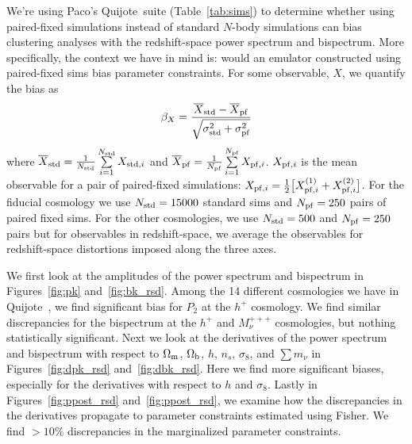 \documentclass[12pt, letterpaper, preprint]{aastex62}
\newcommand{\Om}{\Omega_{\rm m}}
\newcommand{\Ob}{\Omega_{\rm b}}
\newcommand{\smnu}{\sum m_\nu}
\newcommand{\sig}{\sigma_8}
\newcommand{\quij}{{\sc Quijote}~}
\newcommand{\beq}{\begin{equation}}
\newcommand{\eeq}{\end{equation}}
\begin{document}
\sloppy\sloppypar\frenchspacing 
We're using Paco's \quij suite (Table~\ref{tab:sims}) to determine
whether using paired-fixed simulations instead of standard $N$-body 
simulations can bias clustering analyses with the redshift-space
power spectrum and bispectrum. More specifically, the context we have
in mind is: would an emulator constructed using paired-fixed sims
bias parameter constraints. For some observable, $X$, we quantify the 
bias as
\beq
\beta_X = \frac{\overline{X}_{\rm std} - \overline{X}_{\rm pf}}{\sqrt{\sigma_{\rm std}^2 + \sigma_{\rm pf}^2}}
\eeq
where $\overline{X}_{\rm std} = \frac{1}{N_{\rm std}}\sum\limits_{i=1}^{N_{\rm std}} X_{{\rm std}, i}$ 
and $\overline{X}_{\rm pf} = \frac{1}{N_{\rm pf}}\sum\limits_{i=1}^{N_{\rm pf}} X_{{\rm pf}, i}$. 
$X_{{\rm pf},i}$ is the mean observable for a pair of paired-fixed simulations: 
$X_{{\rm pf},i} = \frac{1}{2} \big[ X_{{\rm pf},i}^{(1)} + X_{{\rm pf},i}^{(2)}\big]$.
For the fiducial cosmology we use $N_{\rm std} = 15000$ standard sims and 
$N_{\rm pf} = 250$ pairs of paired fixed sims. For the other cosmologies, 
we use $N_{\rm std} = 500$ and $N_{\rm pf} = 250$ pairs but for observables
in redshift-space, we average the observables for redshift-space distortions
imposed along the three axes. 

We first look at the amplitudes of the power spectrum and bispectrum in 
Figures~\ref{fig:pk} and~\ref{fig:bk_rsd}. Among the 14 different 
cosmologies we have in \quij, we find significant bias for $P_2$ at
the $h^+$ cosmology. We find similar discrepancies for the bispectrum  
at the $h^+$ and $M_\nu^{+++}$ cosmologies, but nothing statistically 
significant. Next we look at the derivatives of the power 
spectrum and bispectrum with respect to $\Om$, $\Ob$, $h$, $n_s$, $\sig$, 
and $\smnu$ in Figures~\ref{fig:dpk_rsd} and~\ref{fig:dbk_rsd}. Here we 
find more significant biases, especially for the derivatives with respect 
to $h$ and $\sig$. Lastly in Figures~\ref{fig:ppost_rsd} and~\ref{fig:ppost_rsd}, 
we examine how the discrepancies in the derivatives propagate to parameter
constraints estimated using Fisher. We find $>10\%$ discrepancies in the 
marginalized parameter constraints. 
\end{document}
